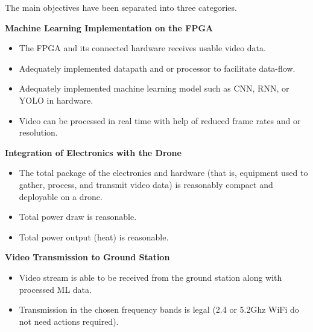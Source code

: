 The main objectives have been separated into three categories.

\textbf{Machine Learning Implementation on the FPGA}
\begin{itemize}
  \item The FPGA and its connected hardware receives usable video data.
  \item Adequately implemented datapath and or processor to facilitate data-flow.
  \item Adequately implemented machine learning model such as CNN, RNN, or YOLO in hardware.
  \item Video can be processed in real time with help of reduced frame rates and or resolution.
\end{itemize}

\textbf{Integration of Electronics with the Drone}
\begin{itemize}
  \item The total package of the electronics and hardware (that is, equipment
  used to gather, process, and transmit video data) is reasonably compact 
  and deployable on a drone.
  \item Total power draw is reasonable.
  \item Total power output (heat) is reasonable.
\end{itemize}

\textbf{Video Transmission to Ground Station}
\begin{itemize}
  \item Video stream is able to be received from the ground station along 
        with processed ML data.
  \item Transmission in the chosen frequency bands is legal (2.4 or 5.2Ghz WiFi
        do not need actions required).
\end{itemize}